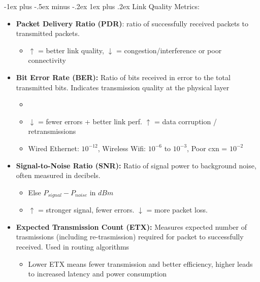 \documentclass[10pt,landscape]{article}
\makeatletter
\newcommand{\subsubsubsection}{\@startsection{subsubsection}{3}{0mm}%
                                {-1ex plus -.5ex minus -.2ex}%
                                {1ex plus .2ex}%
                                {\normalfont\scriptsize\bfseries}}
\newcommand{\1}{\mathmybb{1}}
\makeatother
\begin{document}
\begin{multicols*}{3}
\subsubsubsection{Link Quality Metrics:}
\begin{itemize}
  \item \textbf{Packet Delivery Ratio (PDR)}: ratio of successfully received packets to transmitted packets. 
  \begin{itemize}
    \item $\uparrow$ = better link quality, $\downarrow$ = congestion/interference or poor connectivity
  \end{itemize}
  \item \textbf{Bit Error Rate (BER):} Ratio of bits received in error to the total transmitted bits. Indicates transmission quality at the physical layer
  \begin{itemize}
    \item {}
    \item $\downarrow$ = fewer errors + better link perf. $\uparrow$ = data corruption / retransmissions
    \item Wired Ethernet: $10^{-12}$, Wireless Wifi: $10^{-6}$ to $10^{-3}$, Poor cxn = $10^{-2}$ 
  \end{itemize}
  \item \textbf{Signal-to-Noise Ratio (SNR):} Ratio of signal power to background noise, often measured in decibels. 
  \begin{itemize}
    \item Else $P_{signal} - P_{noise}$ in $dBm$
    \item $\uparrow$ = stronger signal, fewer errors. $\downarrow$ = more packet loss. 
  \end{itemize}
  \item \textbf{Expected Transmission Count (ETX):} Measures expected number of trasmissions (including re-trasmission) required for packet to successfully received. Used in routing algorithms  
  \begin{itemize}
    \item Lower ETX means fewer transmission and better efficiency, higher leads to increased latency and power consumption
  \end{itemize}             
\end{itemize}


\end{multicols*}
\end{document}
